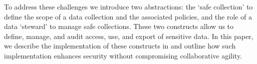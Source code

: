 To address these challenges we introduce two abstractions:
the `safe collection' to define the scope of a data collection
and the associated policies, and the role of a data `steward'
to manage safe collections. These two constructs allow us
to define, manage, and audit access, use, and export of
sensitive data. In this paper, we describe the implementation of these constructs in \NAME and
outline how such implementation enhances security without compromising collaborative agility.


%
